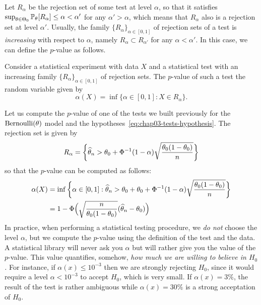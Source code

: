 Let $R_\alpha$ be the rejection set of some test at level $\alpha$, so that it satisfies $\sup_{\theta \in \Theta_0} \P_\theta[R_\alpha] \leq \alpha < \alpha'$ for any $\alpha' > \alpha$, which means that $R_\alpha$ also is a rejection set at level $\alpha'$.
Usually, the family $\{ R_\alpha \}_{\alpha \in [0, 1]}$ of rejection sets of a test is \emph{increasing} with respect to $\alpha$, namely $R_\alpha \subset R_{\alpha'}$ for any $\alpha < \alpha'$.
In this case, we can define the $p$-value as follows.
\begin{definition}
	Consider a statistical experiment with data $X$ and a statistical test with an increasing family $\{ R_\alpha \}_{\alpha \in [0, 1]}$ of rejection sets.
	The $p$-value of such a test the random variable given by
	\begin{equation*}
		\alpha(X) = \inf \{ \alpha \in [0, 1] : X \in R_\alpha \}.	
	\end{equation*}
\end{definition}
Let us compute the $p$-value of one of the tests we built previously for the $\ber(\theta)$ model and the hypotheses~\eqref{eq:chap03-tests-hypothesis}.
The rejection set is given by
\begin{equation*}
	R_\alpha = \bigg\{ \wh \theta_n > \theta_0 + \Phi^{-1}(1 - \alpha) \sqrt{\frac{\theta_0 
	(1 - \theta_0)}{n}} \bigg \}
\end{equation*}
so that the $p$-value can be computed as follows:
\begin{align*}
	\alpha(X) &= \inf \bigg\{ \alpha \in [0, 1] : \wh \theta_n > \theta_0 + \theta_0 + \Phi^{-1}(1 - \alpha) \sqrt{\frac{\theta_0 (1 - \theta_0)}{n}}  \bigg\} \\
	&= 1 - \Phi\Big(  \sqrt{\frac{n}{\theta_0 (1 - \theta_0)}} (\wh \theta_n - \theta_0) \Big)
\end{align*}
In practice, when performing a statistical testing procedure, we \emph{do not} choose the level $\alpha$, but we compute the $p$-value using the definition of the test and the data.
A statistical library will never ask you $\alpha$ but will rather give you the value of the $p$-value.
This value quantifies, somehow, \emph{how much we are willing to believe in $H_0$.}
For instance, if $\alpha(x) \leq 10^{-3}$
then we are strongly rejecting $H_0$, since it would require a level $\alpha < 10^{-3}$ to accept $H_0$, which is very small. 
If $\alpha(x) = 3\%$, the result of the test is rather ambiguous while $\alpha(x) = 30\%$ is a strong acceptation of $H_0$.


